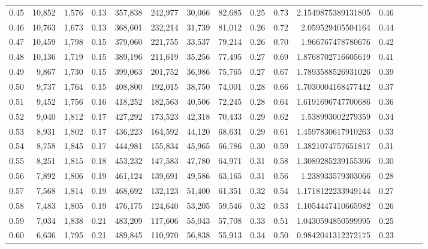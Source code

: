 \begin{tabular}{rrrrrrrrrrrrrrr}
0.45 &  10,852 &  1,576 &  0.13 &  357,838 &  242,977 &   30,066 &   82,685 &  0.25 &  0.73 &     2.1549875389131805 &      0.46 \\
0.46 &  10,763 &  1,673 &  0.13 &  368,601 &  232,214 &   31,739 &   81,012 &  0.26 &  0.72 &      2.059529405504164 &      0.44 \\
0.47 &  10,459 &  1,798 &  0.15 &  379,060 &  221,755 &   33,537 &   79,214 &  0.26 &  0.70 &      1.966767478780676 &      0.42 \\
0.48 &  10,136 &  1,719 &  0.15 &  389,196 &  211,619 &   35,256 &   77,495 &  0.27 &  0.69 &     1.8768702716605619 &      0.41 \\
0.49 &   9,867 &  1,730 &  0.15 &  399,063 &  201,752 &   36,986 &   75,765 &  0.27 &  0.67 &     1.7893588526931026 &      0.39 \\
0.50 &   9,737 &  1,764 &  0.15 &  408,800 &  192,015 &   38,750 &   74,001 &  0.28 &  0.66 &     1.7030004168477442 &      0.37 \\
0.51 &   9,452 &  1,756 &  0.16 &  418,252 &  182,563 &   40,506 &   72,245 &  0.28 &  0.64 &     1.6191696747700686 &      0.36 \\
0.52 &   9,040 &  1,812 &  0.17 &  427,292 &  173,523 &   42,318 &   70,433 &  0.29 &  0.62 &      1.538993002279359 &      0.34 \\
0.53 &   8,931 &  1,802 &  0.17 &  436,223 &  164,592 &   44,120 &   68,631 &  0.29 &  0.61 &     1.4597830617910263 &      0.33 \\
0.54 &   8,758 &  1,845 &  0.17 &  444,981 &  155,834 &   45,965 &   66,786 &  0.30 &  0.59 &     1.3821074757651817 &      0.31 \\
0.55 &   8,251 &  1,815 &  0.18 &  453,232 &  147,583 &   47,780 &   64,971 &  0.31 &  0.58 &     1.3089285239155306 &      0.30 \\
0.56 &   7,892 &  1,806 &  0.19 &  461,124 &  139,691 &   49,586 &   63,165 &  0.31 &  0.56 &      1.238933579303066 &      0.28 \\
0.57 &   7,568 &  1,814 &  0.19 &  468,692 &  132,123 &   51,400 &   61,351 &  0.32 &  0.54 &     1.1718122233949144 &      0.27 \\
0.58 &   7,483 &  1,805 &  0.19 &  476,175 &  124,640 &   53,205 &   59,546 &  0.32 &  0.53 &     1.1054447410665982 &      0.26 \\
0.59 &   7,034 &  1,838 &  0.21 &  483,209 &  117,606 &   55,043 &   57,708 &  0.33 &  0.51 &     1.0430594850599995 &      0.25 \\
0.60 &   6,636 &  1,795 &  0.21 &  489,845 &  110,970 &   56,838 &   55,913 &  0.34 &  0.50 &     0.9842041312272175 &      0.23 \\

\end{tabular}
